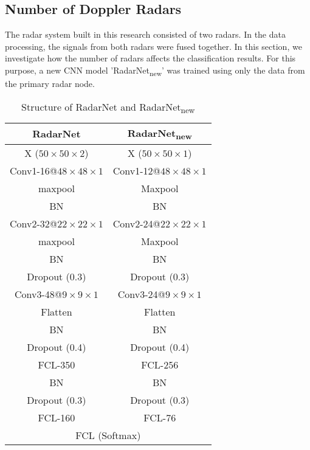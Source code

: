 \subsection{Number of Doppler Radars}
The radar system built in this research consisted of two radars. In the data processing, the signals from both radars were fused together. In this section, we investigate how the number of radars affects the classification results. For this purpose, a new CNN model 'RadarNet\textsubscript{new}' was trained using only the data from the primary radar node. 
\begin{table}[]
\centering
\caption{Structure of RadarNet and RadarNet\textsubscript{new}}
\label{tb-srr}
\begin{tabular}{|c|c|}
\hline
\textbf{RadarNet} & \textbf{RadarNet\textsubscript{new}} \\ \hline
X ($50\times 50\times 2$)       & X ($50\times50\times1$)          \\ \hline
Conv1-16@$48\times48\times1$  & Conv1-12@$48\times48\times1$     \\ \hline
maxpool           & Maxpool              \\ \hline
BN                & BN                   \\ \hline
Conv2-32@$22\times22\times1$  & Conv2-24@$22\times22\times1$     \\ \hline
maxpool           & Maxpool              \\ \hline
BN                & BN                   \\ \hline
Dropout (0.3)     & Dropout (0.3)        \\ \hline
Conv3-48@$9\times9\times1$    & Conv3-24@$9\times9\times1$       \\ \hline
Flatten           & Flatten              \\ \hline
BN                & BN                   \\ \hline
Dropout (0.4)     & Dropout (0.4)        \\ \hline
FCL-350           & FCL-256              \\ \hline
BN                & BN                   \\ \hline
Dropout (0.3)     & Dropout (0.3)        \\ \hline
FCL-160           & FCL-76               \\ \hline
\multicolumn{2}{|c|}{FCL (Softmax)}      \\ \hline
\end{tabular}
\end{table}

